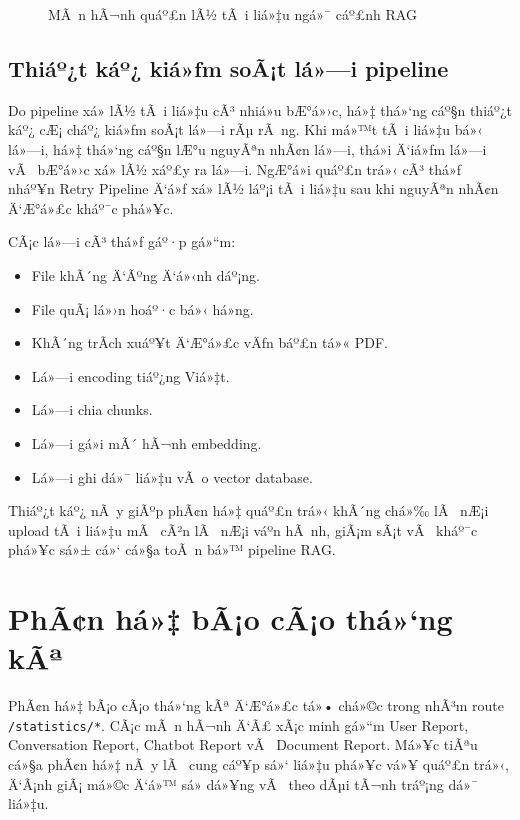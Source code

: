 ﻿\documentclass[12pt,a4paper]{report}
\begin{document}
\begin{figure}[H]
    \centering
    \caption{MÃ n hÃ¬nh quáº£n lÃ½ tÃ i liá»‡u ngá»¯ cáº£nh RAG}
    \label{fig:context-docs}
\end{figure}

\subsection{Thiáº¿t káº¿ kiá»ƒm soÃ¡t lá»—i pipeline}

Do pipeline xá»­ lÃ½ tÃ i liá»‡u cÃ³ nhiá»u bÆ°á»›c, há»‡ thá»‘ng cáº§n thiáº¿t káº¿ cÆ¡ cháº¿ kiá»ƒm soÃ¡t lá»—i rÃµ rÃ ng. Khi má»™t tÃ i liá»‡u bá»‹ lá»—i, há»‡ thá»‘ng cáº§n lÆ°u nguyÃªn nhÃ¢n lá»—i, thá»i Ä‘iá»ƒm lá»—i vÃ  bÆ°á»›c xá»­ lÃ½ xáº£y ra lá»—i. NgÆ°á»i quáº£n trá»‹ cÃ³ thá»ƒ nháº¥n Retry Pipeline Ä‘á»ƒ xá»­ lÃ½ láº¡i tÃ i liá»‡u sau khi nguyÃªn nhÃ¢n Ä‘Æ°á»£c kháº¯c phá»¥c.

CÃ¡c lá»—i cÃ³ thá»ƒ gáº·p gá»“m:

\begin{itemize}
    \item File khÃ´ng Ä‘Ãºng Ä‘á»‹nh dáº¡ng.
    \item File quÃ¡ lá»›n hoáº·c bá»‹ há»ng.
    \item KhÃ´ng trÃ­ch xuáº¥t Ä‘Æ°á»£c vÄƒn báº£n tá»« PDF.
    \item Lá»—i encoding tiáº¿ng Viá»‡t.
    \item Lá»—i chia chunks.
    \item Lá»—i gá»i mÃ´ hÃ¬nh embedding.
    \item Lá»—i ghi dá»¯ liá»‡u vÃ o vector database.
\end{itemize}

Thiáº¿t káº¿ nÃ y giÃºp phÃ¢n há»‡ quáº£n trá»‹ khÃ´ng chá»‰ lÃ  nÆ¡i upload tÃ i liá»‡u mÃ  cÃ²n lÃ  nÆ¡i váº­n hÃ nh, giÃ¡m sÃ¡t vÃ  kháº¯c phá»¥c sá»± cá»‘ cá»§a toÃ n bá»™ pipeline RAG.

\section{PhÃ¢n há»‡ bÃ¡o cÃ¡o thá»‘ng kÃª}

PhÃ¢n há»‡ bÃ¡o cÃ¡o thá»‘ng kÃª Ä‘Æ°á»£c tá»• chá»©c trong nhÃ³m route \texttt{/statistics/*}. CÃ¡c mÃ n hÃ¬nh Ä‘Ã£ xÃ¡c minh gá»“m User Report, Conversation Report, Chatbot Report vÃ  Document Report. Má»¥c tiÃªu cá»§a phÃ¢n há»‡ nÃ y lÃ  cung cáº¥p sá»‘ liá»‡u phá»¥c vá»¥ quáº£n trá»‹, Ä‘Ã¡nh giÃ¡ má»©c Ä‘á»™ sá»­ dá»¥ng vÃ  theo dÃµi tÃ¬nh tráº¡ng dá»¯ liá»‡u.
\end{document}
